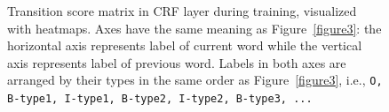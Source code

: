\begin{figure}
\centering
{}
\caption{Transition score matrix in CRF layer during training, visualized with heatmaps. Axes have the same meaning as Figure~\ref{figure3}: the horizontal axis represents label of current word while the vertical axis represents label of previous word. Labels in both axes are arranged by their types in the same order as Figure~\ref{figure3}, i.e., \texttt{O, B-type1, I-type1, B-type2, I-type2, B-type3, ...}}
\label{figure4}
\end{figure}
